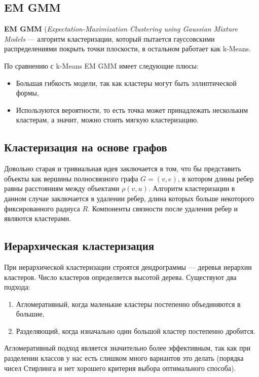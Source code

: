 \subsection{EM GMM}

\begin{definition}
    \textbf{EM GMM} (\textit{Expectation-Maximization Clustering using Gaussian Mixture Models} --- алгоритм кластеризации, который пытается гауссовскими распределениями покрыть точки плоскости, в остальном работает как k-Means.
\end{definition}

По сравнению с k-Means EM GMM имеет следующие плюсы:
\begin{itemize}
    \item Большая гибкость модели, так как кластеры могут быть эллиптической формы,
    \item Используются вероятности, то есть точка может принадлежать нескольким кластерам, а значит, можно стоить мягкую кластеризацию.
\end{itemize}

\subsection{Кластеризация на основе графов}

Довольно старая и тривиальная идея заключается в том, что бы представить объекты как вершины полносвязного графа $G=(v,e)$, в котором длины ребер равны расстояниям между объектами $\rho(v,u)$. Алгоритм кластеризации в данном случае заключается в удалении ребер, длина которых больше некоторого фиксированного радиуса $R$. Компоненты связности после удаления ребер и являются кластерами.

\subsection{Иерархическая кластеризация}

При иерархической кластеризации строятся дендрограммы --- деревья иерархии кластеров. Число кластеров определяется высотой дерева. Существуют два подхода:
\begin{enumerate}
    \item Агломеративный, когда маленькие кластеры постепенно объединяются в большие,
    \item Разделяющий, когда изначально один большой кластер постепенно дробится.
\end{enumerate}

\begin{remark}
    Агломеративный подход является значительно более эффективным, так как при разделении классов у нас есть слишком много вариантов это делать (порядка чисел Стирлинга и нет хорошего критерия выбора оптимального способа). 
\end{remark}

